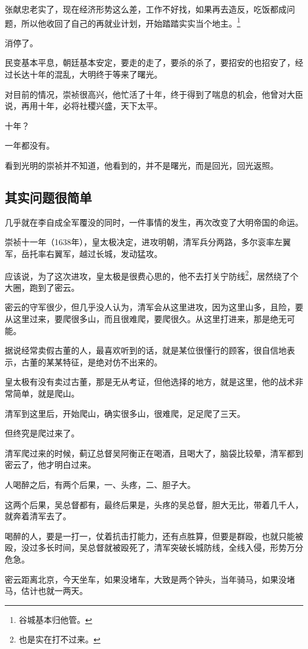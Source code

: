 \begin{multicols}{\theparacolNo}
张献忠老实了，现在经济形势这么差，工作不好找，如果再去造反，吃饭都成问题，所以他收回了自己的再就业计划，开始踏踏实实当个地主。\footnote{谷城基本归他管。}

消停了。

民变基本平息，朝廷基本安定，要走的走了，要杀的杀了，要招安的也招安了，经过长达十年的混乱，大明终于等来了曙光。

对目前的情况，崇祯很高兴，他忙活了十年，终于得到了喘息的机会，他曾对大臣说，再用十年，必将社稷兴盛，天下太平。

十年？

一年都没有。

看到光明的崇祯并不知道，他看到的，并不是曙光，而是回光，回光返照。

\subsection{其实问题很简单}
几乎就在李自成全军覆没的同时，一件事情的发生，再次改变了大明帝国的命运。

崇祯十一年（1638年），皇太极决定，进攻明朝，清军兵分两路，多尔衮率左翼军，岳托率右翼军，越过长城，发动猛攻。

应该说，为了这次进攻，皇太极是很费心思的，他不去打关宁防线\footnote{也是实在打不过来。}，居然绕了个大圈，跑到了密云。

密云的守军很少，但几乎没人认为，清军会从这里进攻，因为这里山多，且险，要从这里过来，要爬很多山，而且很难爬，要爬很久。从这里打进来，那是绝无可能。

据说经常卖假古董的人，最喜欢听到的话，就是某位很懂行的顾客，很自信地表示，古董的某某特征，是绝对仿不出来的。

皇太极有没有卖过古董，那是无从考证，但他选择的地方，就是这里，他的战术非常简单，就是爬山。

清军到这里后，开始爬山，确实很多山，很难爬，足足爬了三天。

但终究是爬过来了。

清军爬过来的时候，蓟辽总督吴阿衡正在喝酒，且喝大了，脑袋比较晕，清军都到密云了，他才明白过来。

人喝醉之后，有两个后果，一、头疼，二、胆子大。

这两个后果，吴总督都有，最终后果是，头疼的吴总督，胆大无比，带着几千人，就奔着清军去了。

喝醉的人，要是一打一，仗着抗击打能力，还有点胜算，但要是群殴，也就只能被殴，没过多长时间，吴总督就被殴死了，清军突破长城防线，全线入侵，形势万分危急。

密云距离北京，今天坐车，如果没堵车，大致是两个钟头，当年骑马，如果没堵马，估计也就一两天。


\end{multicols}
